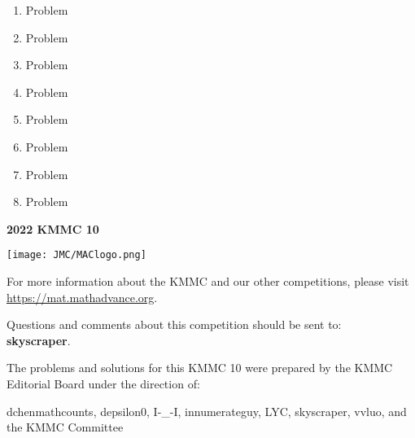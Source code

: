 \documentclass[10pt, twoside]{article}
\newcommand{\theYear}{2022}
\newcommand{\contestNumber}{10}
\newcommand{\contestName}{KMMC}
\newcommand{\committeeName}{KMMC Committee}
\begin{document}
\begin{justify}
\begin{enumerate}[itemsep=3.76389mm]
\ans{}{}{}{}{}

\item Problem

\ans{}{}{}{}{}

\item Problem

\ans{}{}{}{}{}

\item Problem

\ans{}{}{}{}{}

\item Problem

\ans{}{}{}{}{}

\item Problem

\ans{}{}{}{}{}

\item Problem

\ans{}{}{}{}{}

\item Problem

\ans{}{}{}{}{}

\item Problem

\ans{}{}{}{}{}
\end{enumerate}

\newpage
\thispagestyle{empty}
\begin{center}\textbf{\huge {\theYear} {\contestName} {\contestNumber}} \end{center}
\vspace{-6mm}
\begin{center} \noindent\hrulefill \end{center}
\vspace{-3mm}
\begin{center} \texttt{[image: JMC/MAClogo.png]}
\end{center}
\vspace{-5mm}
\begin{center}
For more information about the {\contestName} and our other competitions, please visit \url{https://mat.mathadvance.org}. 
\end{center}
\begin{center} Questions and comments about this competition should be sent to:  
\vspace{4mm}
\\ \textbf{skyscraper}.\end{center}
\begin{center}The problems and solutions for this {\contestName} {\contestNumber} were prepared by the {\contestName} Editorial Board under the direction of:\end{center}
\vspace{-3.5mm}
\begin{center}
dchenmathcounts, depsilon0, I-\_-I, innumerateguy, LYC, skyscraper, vvluo,
and the {\committeeName}\end{center}
\end{justify}
\end{document}
